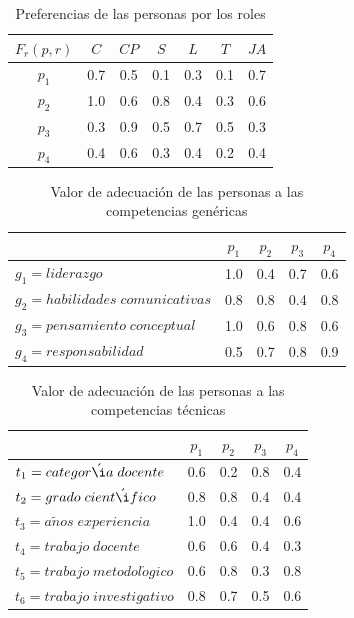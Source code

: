 \begin{table}[H]
	\centering
	\caption{Preferencias de las personas por los roles}\label{pr-carga}
	\begin{tabular}{|c|c|c|c|c|c|c|}
		\hline
		$F_r(p,r)$  & $C$ & $CP$ & $S$ & $L$ & $T$  & $JA$ \\ \hline
		$p_1$   	& 0.7 &  0.5 & 0.1 & 0.3 &  0.1 &  0.7 \\ \hline
		$p_2$   	& 1.0 &  0.6 & 0.8 & 0.4 &  0.3 &  0.6  \\ \hline
		$p_3$  	 	& 0.3 &  0.9 & 0.5 & 0.7 &  0.5 &  0.3  \\ \hline
		$p_4$    	& 0.4 &  0.6 & 0.3 & 0.4 &  0.2 &  0.4  \\ \hline
	\end{tabular}
\end{table}

\begin{table}[H]
	\centering
	\caption{Valor de adecuación de las personas a las competencias genéricas}\label{pcg-carga}
	\begin{tabular}{|l|c|c|c|c|}
		\hline
		\thead{$F_g(p,g)$} & $p_1$ & $p_2$ & $p_3$ & $p_4$ \\ \hline
		$g_1=liderazgo$  	   &  1.0  &  0.4  &  0.7 & 0.6 \\ \hline
		$g_2=habilidades\;comunicativas$      &  0.8  &  0.8  &  0.4 & 0.8 \\ \hline
		$g_3=pensamiento\;conceptual$  	   &  1.0  &  0.6  &  0.8 & 0.6 \\ \hline
		$g_4=responsabilidad$  	   &  0.5  &  0.7  &  0.8 & 0.9 \\ \hline
	\end{tabular}
\end{table}

\begin{table}[H]
	\centering
	\caption{Valor de adecuación de las personas a las competencias técnicas}\label{pct-carga}
	\begin{tabular}{|l|c|c|c|c|}
		\hline
		\thead{$F_t(p,t)$} & $p_1$ & $p_2$ & $p_3$ & $p_4$ \\ \hline
		$t_1=categor\acute{\i}a\;docente$  	   &  0.6  &  0.2  &  0.8 &  0.4 \\ \hline
		$t_2=grado\;cient\acute{\i}fico$      &  0.8  &  0.8  &  0.4 &  0.4 \\ \hline
		$t_3=a\tilde{n}os\;experiencia$  	   &  1.0  &  0.4  &  0.4 &  0.6 \\ \hline
		$t_4=trabajo\;docente$     & 0.6 & 0.6 & 0.4 & 0.3 \\ \hline
		$t_5=trabajo\;metodol\acute{o}gico$     & 0.6 & 0.8 & 0.3 & 0.8 \\ \hline
		$t_6=trabajo\;investigativo$     & 0.8 & 0.7 & 0.5 & 0.6 \\ \hline
	\end{tabular}
\end{table}

